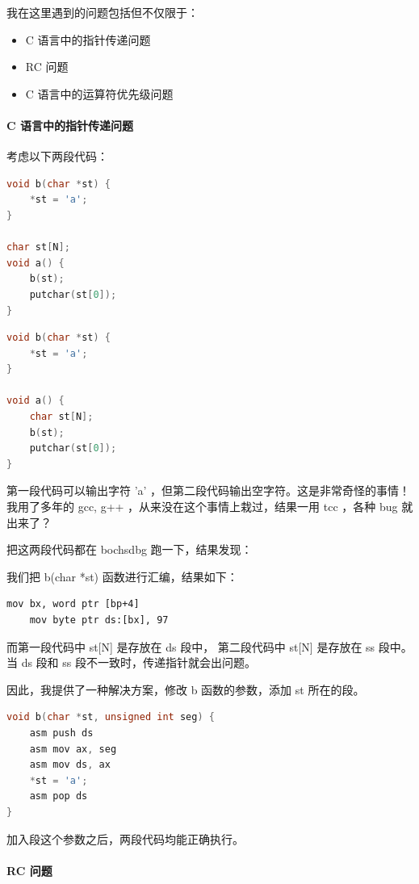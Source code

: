 \documentclass[a4paper]{article}
\begin{document}
我在这里遇到的问题包括但不仅限于：

\begin{itemize}
\item C 语言中的指针传递问题
\item RC 问题
\item C 语言中的运算符优先级问题
\end{itemize}

\paragraph{C 语言中的指针传递问题}

考虑以下两段代码：

\begin{lstlisting}[language=C]
void b(char *st) {
	*st = 'a';
}

char st[N];
void a() {
	b(st);
	putchar(st[0]);
}
\end{lstlisting}

\begin{lstlisting}[language=C]
void b(char *st) {
	*st = 'a';
}

void a() {
	char st[N];
	b(st);
	putchar(st[0]);
}
\end{lstlisting}

第一段代码可以输出字符 'a' ，但第二段代码输出空字符。这是非常奇怪的事情！我用了多年的 gcc, g++ ，从来没在这个事情上栽过，结果一用 tcc ，各种 bug 就出来了？

把这两段代码都在 bochsdbg 跑一下，结果发现：

我们把 b(char *st) 函数进行汇编，结果如下：

\begin{lstlisting}[language={[x86masm]Assembler}]
	mov	bx, word ptr [bp+4]
	mov	byte ptr ds:[bx], 97
\end{lstlisting}

而第一段代码中 st[N] 是存放在 ds 段中， 第二段代码中 st[N] 是存放在 ss 段中。当 ds 段和 ss 段不一致时，传递指针就会出问题。

因此，我提供了一种解决方案，修改 b 函数的参数，添加 st 所在的段。

\begin{lstlisting}[language=C]
void b(char *st, unsigned int seg) {
	asm push ds
	asm mov ax, seg
	asm mov ds, ax
	*st = 'a';
	asm pop ds
}
\end{lstlisting}

加入段这个参数之后，两段代码均能正确执行。

\newpage

\paragraph{RC 问题}
\end{document}
